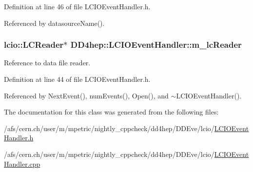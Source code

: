 Definition at line 46 of file LCIOEventHandler.h.

Referenced by datasourceName().\hypertarget{class_d_d4hep_1_1_l_c_i_o_event_handler_ae350f66667954755d793b2e4a41adbba}{
\subsubsection[{m\_\-lcReader}]{\setlength{\rightskip}{0pt plus 5cm}lcio::LCReader$\ast$ {\bf DD4hep::LCIOEventHandler::m\_\-lcReader}}}
\label{class_d_d4hep_1_1_l_c_i_o_event_handler_ae350f66667954755d793b2e4a41adbba}


Reference to data file reader. 

Definition at line 44 of file LCIOEventHandler.h.

Referenced by NextEvent(), numEvents(), Open(), and $\sim$LCIOEventHandler().

The documentation for this class was generated from the following files:\begin{DoxyCompactItemize}
\item 
/afs/cern.ch/user/m/mpetric/nightly\_\-cppcheck/dd4hep/DDEve/lcio/\hyperlink{_l_c_i_o_event_handler_8h}{LCIOEventHandler.h}\item 
/afs/cern.ch/user/m/mpetric/nightly\_\-cppcheck/dd4hep/DDEve/lcio/\hyperlink{_l_c_i_o_event_handler_8cpp}{LCIOEventHandler.cpp}\end{DoxyCompactItemize}
